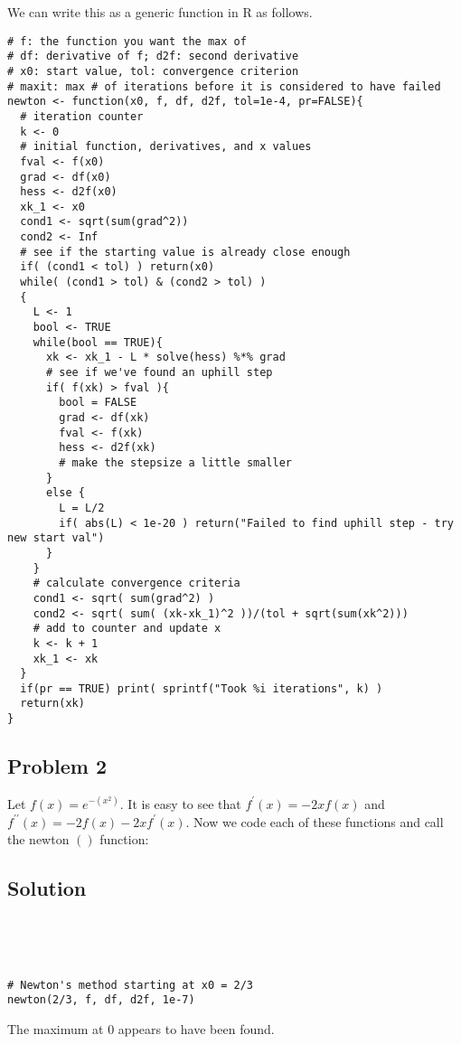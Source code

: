 \documentclass[12pt]{article}
\begin{document}
We can write this as a generic function in R as follows.
\begin{verbatim}
# f: the function you want the max of
# df: derivative of f; d2f: second derivative
# x0: start value, tol: convergence criterion
# maxit: max # of iterations before it is considered to have failed
newton <- function(x0, f, df, d2f, tol=1e-4, pr=FALSE){
  # iteration counter
  k <- 0
  # initial function, derivatives, and x values
  fval <- f(x0)
  grad <- df(x0)
  hess <- d2f(x0)
  xk_1 <- x0
  cond1 <- sqrt(sum(grad^2))
  cond2 <- Inf
  # see if the starting value is already close enough
  if( (cond1 < tol) ) return(x0)
  while( (cond1 > tol) & (cond2 > tol) )
  {
    L <- 1
    bool <- TRUE
    while(bool == TRUE){
      xk <- xk_1 - L * solve(hess) %*% grad
      # see if we've found an uphill step
      if( f(xk) > fval ){
        bool = FALSE
        grad <- df(xk)
        fval <- f(xk)
        hess <- d2f(xk)
        # make the stepsize a little smaller
      } 
      else {
        L = L/2
        if( abs(L) < 1e-20 ) return("Failed to find uphill step - try new start val")
      }
    }
    # calculate convergence criteria
    cond1 <- sqrt( sum(grad^2) )
    cond2 <- sqrt( sum( (xk-xk_1)^2 ))/(tol + sqrt(sum(xk^2)))
    # add to counter and update x
    k <- k + 1
    xk_1 <- xk
  }
  if(pr == TRUE) print( sprintf("Took %i iterations", k) )
  return(xk)
}
\end{verbatim}

\subsection*{Problem 2}

Let $f(x)=e^{-(x^{2})}$. It is easy to see that $f^{\prime}(x)=-2xf(x)$ and $f^{\prime\prime}(x)=-2f(x)-2xf^{\prime}(x)$. 
Now we code each of these functions and call the newton $()$ function:
\subsection*{Solution}
\begin{verbatim}




# Newton's method starting at x0 = 2/3
newton(2/3, f, df, d2f, 1e-7)
\end{verbatim}


The maximum at $0$ appears to have been found.
\end{document}
